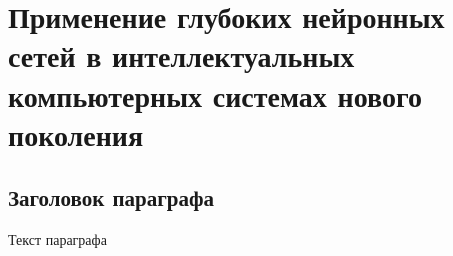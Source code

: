 \chapter{Применение глубоких нейронных сетей в интеллектуальных компьютерных системах нового поколения}
\label{chapter_deep_ann}


\section{Заголовок параграфа}
Текст параграфа

%